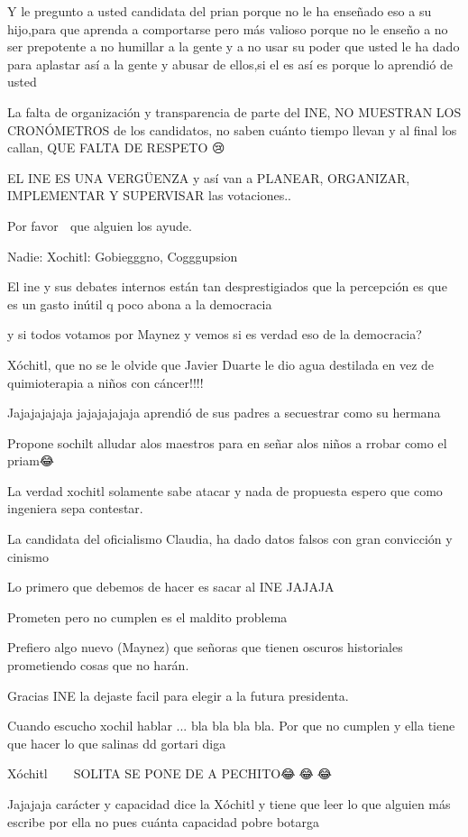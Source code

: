 Y le pregunto a usted candidata del prian porque no le ha enseñado eso a su hijo,para que aprenda a comportarse pero más valioso porque no le enseño a no ser prepotente a no humillar a la gente y a no usar su poder que usted le ha dado para aplastar así a la gente y abusar de ellos,si el es así es porque lo aprendió de usted

La falta de organización y transparencia de parte del INE, NO MUESTRAN LOS CRONÓMETROS de los candidatos, no saben cuánto tiempo llevan y al final los callan, QUE FALTA DE RESPETO 😢

EL INE ES UNA VERGÜENZA y así van a PLANEAR, ORGANIZAR, IMPLEMENTAR Y SUPERVISAR las votaciones..

Por favor 🙏 que alguien los ayude.

Nadie:
Xochitl: Gobiegggno, Cogggupsion

El ine y sus debates internos están tan desprestigiados que la percepción es que es un gasto inútil q poco abona a la democracia

y si todos votamos por Maynez y vemos si es verdad eso de la democracia?

Xóchitl, que no se le olvide que Javier Duarte le dio agua destilada en vez de quimioterapia a niños con cáncer!!!!

Jajajajajaja jajajajajaja aprendió de sus padres a secuestrar como su hermana

Propone sochilt alludar alos maestros para en señar alos niños a rrobar como el priam😂

La verdad xochitl  solamente sabe atacar y nada de propuesta espero que como ingeniera  sepa contestar.

La candidata del oficialismo Claudia,  ha dado datos falsos con gran convicción y cinismo

Lo primero que debemos de hacer es sacar al INE JAJAJA

Prometen pero no cumplen es el maldito problema

Prefiero algo nuevo (Maynez) que señoras que tienen oscuros historiales prometiendo cosas que no harán.

Gracias INE la dejaste facil para elegir a la futura presidenta.

Cuando escucho xochil  hablar
... bla bla bla  bla. Por que no cumplen y ella tiene que hacer lo que salinas dd gortari diga

Xóchitl 🤣😂🤣😂😂 SOLITA SE PONE DE A PECHITO😂🤣😂🤣😂

Jajajaja carácter y capacidad dice la Xóchitl y tiene que leer lo que alguien más escribe por ella no pues cuánta capacidad pobre botarga

